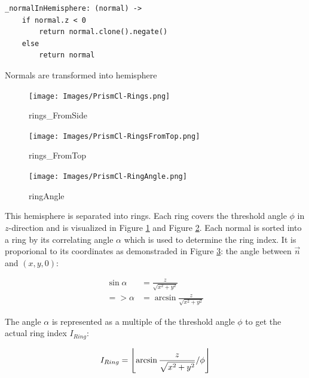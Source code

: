 \documentclass[../ClassicThesis.tex]{subfiles}
\begin{document}
\begin{listing}[!h]
\centering
\begin{verbatim}
_normalInHemisphere: (normal) ->
    if normal.z < 0
        return normal.clone().negate()
    else
        return normal
\end{verbatim}
\caption{Normals are transformed into hemisphere}
\label{lst:_normalInHemisphere}
\end{listing}

\begin{figure}
    \texttt{[image: Images/PrismCl-Rings.png]}
    \caption{rings_FromSide}
    \label{fig:rings_FromSide}
\end{figure}

\begin{figure}
    \texttt{[image: Images/PrismCl-RingsFromTop.png]}
    \caption{rings_FromTop}
    \label{fig:rings_FromTop}
\end{figure}

\begin{figure}
    \texttt{[image: Images/PrismCl-RingAngle.png]}
    \caption{ringAngle}
    \label{fig:ringAngle}
\end{figure}


This hemisphere is separated into rings. Each ring covers the threshold angle $\phi$ in $z$-direction and is visualized in Figure \ref{fig:rings_FromSide} and Figure \ref{fig:rings_FromTop}. Each normal is sorted into a ring by its correlating angle $\alpha$ which is used to determine the ring index. It is proporional to its coordinates as demonstraded in Figure \ref{fig:ringAngle}: the angle between $\vec{n}$ and $(x,y,0)$:

\begin{equation*}
\begin{split}
    \sin{\alpha} & = \frac{z}{ \sqrt{x^{2} + y^{2}} } \\
    => \alpha  & = \arcsin{ \frac{z}{ \sqrt{x^{2} + y^{2}} } }
\end{split}
\end{equation*}


The angle $\alpha$ is represented as a multiple of the threshold angle $\phi$ to get the actual ring index $I_{Ring}$:

\begin{equation*}
    I_{Ring} = \floor*{ 
                    \arcsin{ 
                        \frac{z}{ \sqrt{ x^{2} + y^{2} } } 
                    } 
                    / \phi 
                }
\end{equation*}
\end{document}
